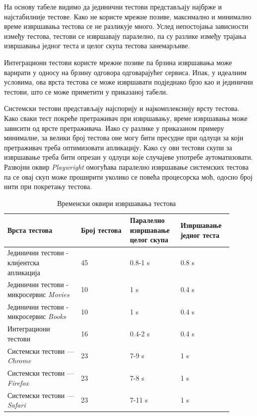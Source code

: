 \documentclass[12pt,oneside]{memoir}
\begin{document}
На основу табеле видимо да јединични тестови представљају најбрже и најстабилније тестове. Како не користе мрежне позиве, максимално и минимално време извршавања тестова се не разликује много. Услед непостојања зависности између тестова, тестови се извршавају паралелно, па су разлике између трајања извршавања једног теста и целог скупа тестова занемарљиве.

Интеграциони тестови користе мрежне позиве па брзина извршавања може варирати у односу на брзину одговора одговарајућег сервиса. Ипак, у идеалним условима, ова врста тестова се може извршавати подједнако брзо као и јединични тестови, што се може приметити у приказаној табели.

Системски тестови представљају најспорију и најкомплекснију врсту тестова. Како сваки тест покреће претраживач при извршавању, време извршавања може зависити од врсте претраживача. Иако су разлике у приказаном примеру минималне, за велики број тестова оне могу бити пресудне при одлуци за који претраживач треба оптимизовати апликацију. Како су ови тестови скупи за извршавање треба бити опрезан у одлуци које случајеве употребе аутоматизовати.
Развојни оквир \textit{Playwright} омогућава паралелно извршавање системских тестова па се овај скуп може проширити уколико се повећа процесорска моћ, одосно број нити при покретању тестова. 

\begin{table}
\label{tbl:vreme}
\caption{Временски оквири извршавања тестова}
\begin{tabular}{|p{0.3\linewidth} p{0.2\linewidth} p{0.2\linewidth} p{0.2\linewidth}|}
\hline
 \textbf{Врста тестова} & \textbf{Број тестова} &\textbf{Паралелно извршавање целог скупа} & \textbf{Извршавање једног теста} \\ [0.5ex] 
 \hline
 Јединични тестови - клијентска апликација & 45 & 0.8-1 s & 0.8 s\\ 
  \hline
 Јединични тестови - микросервис \textit{Movies} & 10 & 1 s & 0.4 s\\ 
  \hline
 Јединични тестови - микросервис \textit{Books} & 10 & 1 s & 0.4 s\\ 
 \hline
 Интеграциони тестови & 16 & 0.4-2 s & 0.4 s \\
 \hline
 Системски тестови --- \textit{Chrome} & 23 & 7-9 s & 1 s \\
  \hline
 Системски тестови  --- \textit{Firefox} & 23 & 7-8 s & 1 s \\
  \hline
 Системски тестови --- \textit{Safari} & 23 & 7-11 s & 1 s \\
 \hline
\end{tabular}
\end{table}
\end{document}
